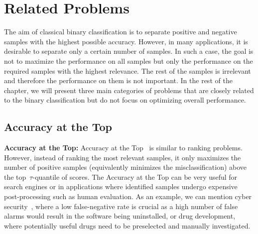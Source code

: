 \section{Related Problems}

The aim of classical binary classification is to separate positive and negative samples with the highest possible accuracy. However, in many applications, it is desirable to separate only a certain number of samples. In such a case, the goal is not to maximize the performance on all samples but only the performance on the required samples with the highest relevance. The rest of the samples is irrelevant and therefore the performance on them is not important. In the rest of the chapter, we will present three main categories of problems that are closely related to the binary classification but do not focus on optimizing overall performance.  

\subsection{Accuracy at the Top}

\textbf{Accuracy at the Top:} Accuracy at the Top~\cite{boyd2012accuracy, grill2016learning} is similar to ranking problems. However, instead of ranking the most relevant samples, it only maximizes the number of positive samples (equivalently minimizes the misclassification)  above the top~$\tau$-quantile of scores. The Accuracy at the Top can be very useful for search engines or in applications where identified samples undergo expensive post-processing such as human evaluation. As an example, we can mention cyber security~\cite{grill2016learning}, where a low false-negative rate is crucial as a high number of false alarms would result in the software being uninstalled, or drug development, where potentially useful drugs need to be preselected and manually investigated.

